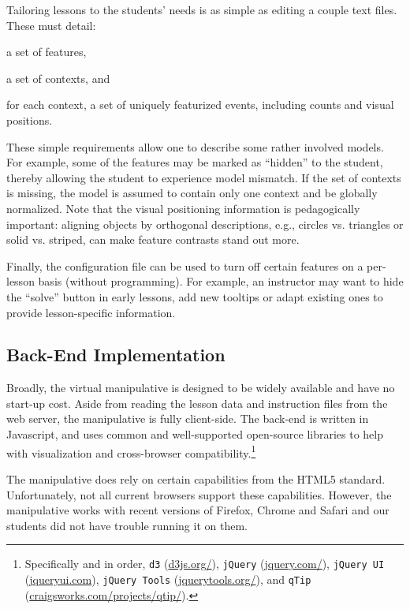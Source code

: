 \documentclass[11pt,letterpaper]{article}
\newcommand{\Note}[1]{}
\renewcommand{\Note}[1]{\hl{[#1]}}  %
\newcommand{\NoteSigned}[3]{{\sethlcolor{#2}\Note{#1: #3}}}
\newcommand{\NoteFF}[1]{\NoteSigned{FF}{LightBlue}{#1}}
\newcommand{\NoteJE}[1]{\NoteSigned{JE}{LightGreen}{#1}}
\begin{document}
Tailoring lessons to the students' needs is as simple as editing a couple text files. These must detail:
\begin{inparaenum}[(1)]
\item a set of features, 
\item a set of contexts, and
\item for each context, a set of uniquely featurized events, including counts and visual positions.
\end{inparaenum}
These simple requirements allow one to describe some rather involved models. For example, some of 
the features may be marked as ``hidden'' to the student, thereby allowing the student to experience 
model mismatch. If the set of contexts is missing, the model is assumed to contain only 
one context and be globally normalized. Note that the visual positioning information is pedagogically 
important: aligning objects by orthogonal descriptions, e.g., circles vs. triangles or solid vs. striped, 
can make feature contrasts stand out more.

Finally, the configuration file can be used to turn off certain
features on a per-lesson basis (without programming).  For example, 
an instructor may want to hide the ``solve'' button in early lessons, add new tooltips or adapt existing 
ones to provide lesson-specific information.

\subsection{Back-End Implementation}
Broadly, the virtual manipulative is designed to be widely available and have no start-up cost. 
Aside from reading the lesson data and instruction files from the web server, the manipulative is fully 
client-side. The back-end is written in Javascript, and uses common and well-supported open-source 
libraries to help with visualization and cross-browser compatibility.\footnote{Specifically and in order, 
\texttt{d3} (\url{d3js.org/}),
\texttt{jQuery} (\url{jquery.com/}), 
\texttt{jQuery UI} (\url{jqueryui.com}),
\texttt{jQuery Tools} (\url{jquerytools.org/}), and
\texttt{qTip} (\url{craigsworks.com/projects/qtip/}).}

The manipulative does rely on certain capabilities from the HTML5
standard. Unfortunately, not all current browsers support these
capabilities.
However, the manipulative works with recent versions of Firefox, Chrome and Safari and 
our students did not have trouble running it on them.
%
\end{document}
